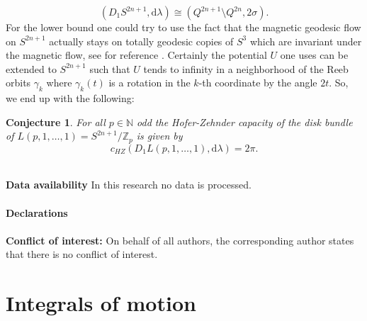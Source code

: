 \documentclass[12pt]{article}
\newtheorem{Conjecture}[Definition]{Conjecture}
\def\gc{{\gamma}}
\newcommand{\Z}{\mathbb{Z}} %
\newcommand{\N}{\mathbb{N}} %
\newcommand{\dd}{\mathrm{d}}
\begin{document}
$$
(D_1S^{2n+1},\dd\lambda)\cong (Q^{2n+1}\setminus Q^{2n}, 2\sigma).
$$
For the lower bound one could try to use the fact that the magnetic geodesic flow on $S^{2n+1}$ actually stays on totally geodesic copies of $S^3$ which are invariant under the magnetic flow, see for reference \cite{ABM}. Certainly the potential $U$ one uses can be extended to $S^{2n+1}$ such that $U$ tends to infinity in a neighborhood of the Reeb orbits $\gc_k$ where $\gc_k(t)$ is a rotation in the $k$-th coordinate by the angle $2 t$. So, we end up with the following: 
\begin{Conjecture}
    For all $p \in \N$ odd the Hofer-Zehnder capacity of the disk bundle of $L(p,1, \dots, 1)= S^{2n+1}/\Z_p$ is given by
     $$
 c_{HZ}\left( D_1L(p,1, \dots, 1), \dd\lambda\right)= 2\pi. 
 $$
\end{Conjecture}\noindent\\
\textbf{Data availability} In this research no data is processed.\\
\noindent\\ 
\textbf{Declarations}\\\\
\textbf{Conflict of interest:} On behalf of all authors, the corresponding author states that there is no conflict of interest.
\appendix
\section{Integrals of motion}\label{A}
\end{document}
